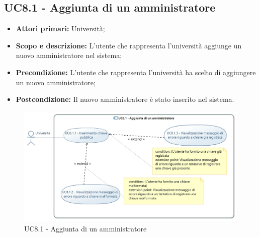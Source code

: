 \documentclass[AnalisiDeiRequisiti.tex]{subfiles}
\begin{document}
\subsection{UC8.1 - Aggiunta di un amministratore}
\begin{itemize}
	\item \textbf{Attori primari:} Università;\\
	\item \textbf{Scopo e descrizione:} L'utente che rappresenta l'università aggiunge un nuovo amministratore nel sistema;
	\item \textbf{Precondizione:} L'utente che rappresenta l'università ha scelto di aggiungere un nuovo amministratore; 
	\item \textbf{Postcondizione:} Il nuovo amministratore è stato inserito nel sistema.
\end{itemize}

\begin{figure}[H]
	\centering
	\includegraphics[width=1.0\linewidth]{UC8_1.jpg}
	\caption{UC8.1 - Aggiunta di un amministratore}
	\label{fig:UC8.1 - Aggiunta di un amministratore}
\end{figure}
\end{document}

